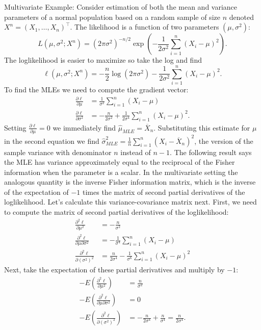 \documentclass[
]{book}
\begin{document}
Multivariate Example: Consider estimation of both the mean and variance parameters of a normal population based on a random sample of size \(n\) denoted \(X^n = (X_1, \ldots, X_n)^\top\). The likelihood is a function of two parameters \((\mu, \sigma^2)\):
\[L(\mu, \sigma^2;X^n) = (2\pi\sigma^2)^{-n/2}\exp\left(-\frac{1}{2\sigma^2}\sum_{i=1}^n (X_i-\mu)^2\right).\]
The loglikelihood is easier to maximize so take the log and find
\[\ell(\mu, \sigma^2;X^n) = -\frac{n}{2}\log (2\pi\sigma^2) -\frac{1}{2\sigma^2}\sum_{i=1}^n (X_i-\mu)^2. \]
To find the MLEs we need to compute the gradient vector:
\begin{align*}
\frac{\partial\ell}{\partial \mu} &= \frac{1}{\sigma^2}\sum_{i=1}^n (X_i-\mu)\\
\frac{\partial\ell}{\partial \sigma^2} &= -\frac{n}{2\sigma^2} + \frac{1}{2\sigma^4}\sum_{i=1}^n (X_i-\mu)^2.
\end{align*}
Setting \(\frac{\partial\ell}{\partial \mu}=0\) we immediately find \(\hat\mu_{MLE} = \overline X_n\). Substituting this estimate for \(\mu\) in the second equation we find \(\hat\sigma^2_{MLE} = \frac{1}{n}\sum_{i=1}^n (X_i-\overline X_n)^2\), the version of the sample variance with denominator \(n\) instead of \(n-1\). The following result says the MLE has variance approximately equal to the reciprocal of the Fisher information when the parameter is a scalar. In the multivariate setting the analogous quantity is the inverse Fisher information matrix, which is the inverse of the expectation of \(-1\) times the matrix of second partial derivatives of the loglikelihood. Let's calculate this variance-covariance matrix next. First, we need to compute the matrix of second partial derivatives of the loglikelihood:\\
\begin{align*}
\frac{\partial^2\ell}{\partial \mu^2} &= -\frac{n}{\sigma^2}\\
\frac{\partial^2\ell}{\partial \mu\partial\sigma^2} &= -\frac{1}{\sigma^4}\sum_{i=1}^n (X_i-\mu)\\
\frac{\partial^2\ell}{\partial (\sigma^2)^2} &= \frac{n}{2\sigma^4} - \frac{1}{\sigma^6}\sum_{i=1}^n (X_i-\mu)^2
\end{align*}
Next, take the expectation of these partial derivatives and multiply by \(-1\):
\begin{align*}
-E(\frac{\partial^2\ell}{\partial \mu^2}) &= \frac{n}{\sigma^2}\\
-E(\frac{\partial^2\ell}{\partial \mu\partial\sigma^2}) &= 0\\
-E(\frac{\partial^2\ell}{\partial (\sigma^2)^2}) &= -\frac{n}{2\sigma^4} + \frac{n}{\sigma^4} = \frac{n}{2\sigma^4}.
\end{align*}
\end{document}
